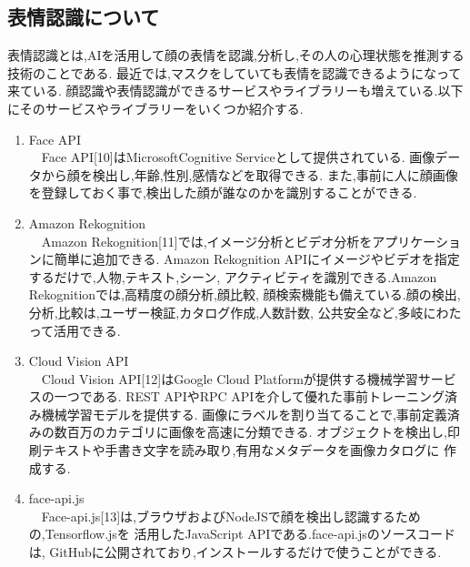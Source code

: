 \subsection{表情認識について}
表情認識とは,AIを活用して顔の表情を認識,分析し,その人の心理状態を推測する技術のことである.
最近では,マスクをしていても表情を認識できるようになって来ている.
顔認識や表情認識ができるサービスやライブラリーも増えている.以下にそのサービスやライブラリーをいくつか紹介する.

\renewcommand{\labelenumi}{(\arabic{enumi})}

\begin{enumerate}
  \item Face API \\
  　Face API[10]はMicrosoftCognitive Serviceとして提供されている.
  画像データから顔を検出し,年齢,性別,感情などを取得できる.
  また,事前に人に顔画像を登録しておく事で,検出した顔が誰なのかを識別することができる.\\

  \item Amazon Rekognition \\
  　Amazon Rekognition[11]では,イメージ分析とビデオ分析をアプリケーションに簡単に追加できる.
  Amazon Rekognition APIにイメージやビデオを指定するだけで,人物,テキスト,シーン,
  アクティビティを識別できる.Amazon Rekognitionでは,高精度の顔分析,顔比較,
  顔検索機能も備えている.顔の検出,分析,比較は,ユーザー検証,カタログ作成,人数計数,
  公共安全など,多岐にわたって活用できる.\\

  \item Cloud Vision API  \\
  　Cloud Vision API[12]はGoogle Cloud Platformが提供する機械学習サービスの一つである.
  REST APIやRPC APIを介して優れた事前トレーニング済み機械学習モデルを提供する.
  画像にラベルを割り当てることで,事前定義済みの数百万のカテゴリに画像を高速に分類できる.
  オブジェクトを検出し,印刷テキストや手書き文字を読み取り,有用なメタデータを画像カタログに
  作成する.\\

  \item face-api.js \\
  　Face-api.js[13]は,ブラウザおよびNodeJSで顔を検出し認識するための,Tensorflow.jsを
  活用したJavaScript APIである.face-api.jsのソースコードは,
  GitHubに公開されており,インストールするだけで使うことができる.
  
\end{enumerate}


